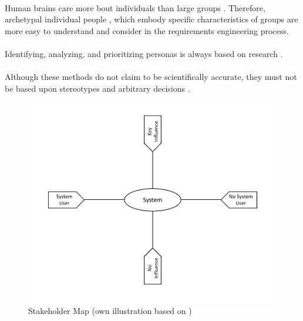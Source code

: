 \paragraph{} Human brains care more bout individuals than large groups \parencite[cf.][]{Platt.2016}. Therefore, archetypal individual people \parencite[cf.][81-82]{Cooper.2007}, which embody specific characteristics of groups \parencite[cf.][]{Platt.2016} are more easy to understand and consider in the requirements engineering process.

\paragraph{} Identifying, analyzing, and prioritizing personas is always based on research \parencites[cf.][39]{Robier.2016}[cf.][80]{Cooper.2007}.

\paragraph{} Although these methods do not claim to be scientifically accurate, they must not be based upon stereotypes and arbitrary decisions \parencite[cf.][82-83]{Cooper.2007}. 

\begin{figure}[H]
\centering
    \includegraphics[scale=1]{img/stakeholderMap.pdf}
    \caption[Stakeholder Map]{Stakeholder Map (own illustration based on \cite[38]{Robier.2016})}
    \label{fig:stakeMap}
\end{figure}

